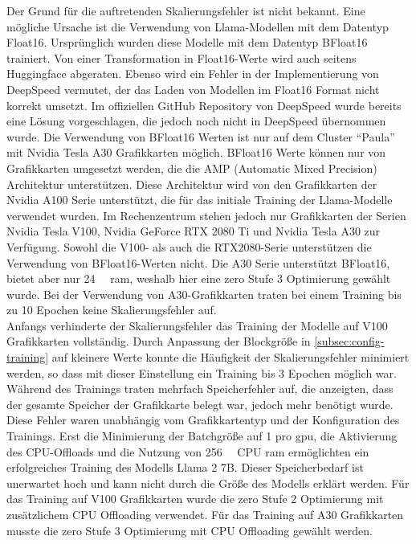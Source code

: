 Der Grund für die auftretenden Skalierungsfehler ist nicht bekannt.
Eine mögliche Ursache ist die Verwendung von Llama-Modellen mit dem Datentyp Float16.
Ursprünglich wurden diese Modelle mit dem Datentyp BFloat16 trainiert.
Von einer Transformation in Float16-Werte wird auch seitens Huggingface abgeraten.
Ebenso wird ein Fehler in der Implementierung von DeepSpeed vermutet, der das Laden von Modellen im Float16 Format nicht korrekt umsetzt.
Im offiziellen GitHub Repository von DeepSpeed wurde bereits eine Lösung vorgeschlagen, die jedoch noch nicht in DeepSpeed übernommen wurde.
Die Verwendung von BFloat16 Werten ist nur auf dem Cluster \enquote{Paula} mit Nvidia Tesla A30 Grafikkarten möglich.
BFloat16 Werte können nur von Grafikkarten umgesetzt werden, die die AMP (Automatic Mixed Precision) Architektur unterstützen.
Diese Architektur wird von den Grafikkarten der Nvidia A100 Serie unterstützt, die für das initiale Training der Llama-Modelle verwendet wurden.
Im Rechenzentrum stehen jedoch nur Grafikkarten der Serien Nvidia Tesla V100, Nvidia GeForce RTX 2080 Ti und Nvidia Tesla A30 zur Verfügung.
Sowohl die V100- als auch die RTX2080-Serie unterstützen die Verwendung von BFloat16-Werten nicht.
Die A30 Serie unterstützt BFloat16, bietet aber nur \SI{24}{\giga\byte} \ac{ram}, weshalb hier eine \ac{zero} Stufe 3 Optimierung gewählt wurde.
Bei der Verwendung von A30-Grafikkarten traten bei einem Training bis zu 10 Epochen keine Skalierungsfehler auf.\\

Anfangs verhinderte der Skalierungsfehler das Training der Modelle auf V100 Grafikkarten vollständig.
Durch Anpassung der Blockgröße in \cref{subsec:config-training} auf kleinere Werte konnte die Häufigkeit der Skalierungsfehler minimiert werden, so dass mit dieser Einstellung ein Training bis 3 Epochen möglich war.\\

Während des Trainings traten mehrfach Speicherfehler auf, die anzeigten, dass der gesamte Speicher der Grafikkarte belegt war, jedoch mehr benötigt wurde.
Diese Fehler waren unabhängig vom Grafikkartentyp und der Konfiguration des Trainings.
Erst die Minimierung der Batchgröße auf 1 pro \ac{gpu}, die Aktivierung des CPU-Offloads und die Nutzung von \SI{256}{\giga\byte} CPU \ac{ram} ermöglichten ein erfolgreiches Training des Modells Llama 2 7B.
Dieser Speicherbedarf ist unerwartet hoch und kann nicht durch die Größe des Modells erklärt werden.
Für das Training auf V100 Grafikkarten wurde die \ac{zero} Stufe 2 Optimierung mit zusätzlichem CPU Offloading verwendet.
Für das Training auf A30 Grafikkarten musste die \ac{zero} Stufe 3 Optimierung mit CPU Offloading gewählt werden.\\

